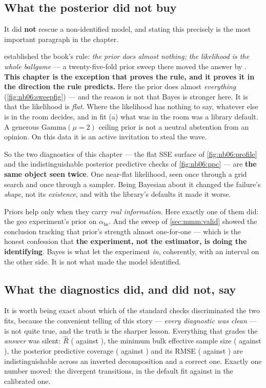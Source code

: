 \subsection*{What the posterior did not buy}

It did \textbf{not} rescue a non-identified model, and stating this precisely is the most important
paragraph in the chapter.

 established the book's rule: \emph{the prior does almost nothing; the likelihood is
the whole ballgame} --- a twenty-five-fold prior sweep there moved the answer by
\eur{\nbZeroPriorShift}. \textbf{This chapter is the exception that proves the rule, and it proves
it in the direction the rule predicts.} Here the prior does almost \emph{everything}
(\cref{fig:nb06:sweepfig}) --- and the reason is not that Bayes is stronger here. It is that the
likelihood is \emph{flat}. Where the likelihood has nothing to say, whatever else is in the room
decides, and in fit (a) what was in the room was a library default. A generous
$\text{Gamma}(\mu = 2)$ ceiling prior is not a neutral abstention from an opinion. On this data it
is an active invitation to steal the wave.

So the two diagnostics of this chapter --- the flat SSE surface of \cref{fig:nb06:profile} and the
indistinguishable posterior predictive checks of \cref{fig:nb06:ppc} --- are \textbf{the same
object seen twice}. One near-flat likelihood, seen once through a grid search and once through a
sampler. Being Bayesian about it changed the failure's \emph{shape}, not its \emph{existence}, and
with the library's defaults it made it worse.

Priors help only when they carry \emph{real information}. Here exactly one of them did: the geo
experiment's prior on $\alpha_{\text{bs}}$. And the sweep of \cref{sec:mmm:valid} showed the
conclusion tracking that prior's strength almost one-for-one --- which is the honest confession
that \textbf{the experiment, not the estimator, is doing the identifying}. Bayes is what let the
experiment \emph{in}, coherently, with an interval on the other side. It is not what made the model
identified.

\subsection*{What the diagnostics did, and did not, say}

It is worth being exact about which of the standard checks discriminated the two fits, because the
convenient telling of this story --- \emph{every diagnostic was clean} --- is not quite true, and
the truth is the sharper lesson. Everything that grades the \emph{answer} was silent: $\hat R$
(\nbSixDefRhat{} against \nbSixCalRhat), the minimum bulk effective sample size (\nbSixDefEss{}
against \nbSixCalEss), the posterior predictive coverage (\pc{\nbSixPpcCovDef} against
\pc{\nbSixPpcCovCal}) and its RMSE (\eur{\nbSixPpcRmseDef} against \eur{\nbSixPpcRmseCal}) are
indistinguishable across an inverted decomposition and a correct one. Exactly one number moved: the
divergent transitions, \nbSixDefDiv{} in the default fit against \nbSixCalDiv{} in the calibrated
one.

